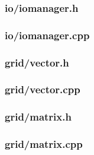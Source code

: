 \documentclass[12pt]{article}
\begin{document}
\subsubsection*{io/iomanager.h}


\subsubsection*{io/iomanager.cpp}


\subsubsection*{grid/vector.h}


\subsubsection*{grid/vector.cpp}


\subsubsection*{grid/matrix.h}


\subsubsection*{grid/matrix.cpp}

\end{document}
